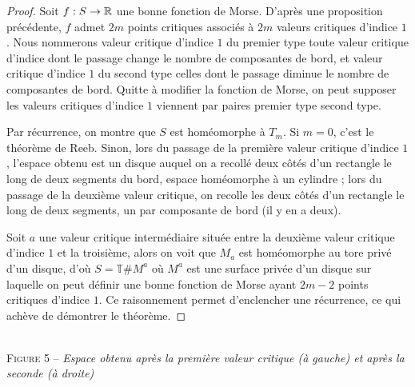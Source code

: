 \begin{proof}
    Soit $f:S\to\operatorname{\mathbb R}$ une bonne fonction de Morse. D'après une proposition précédente, $f$ admet 
    $2m$ points critiques associés à $2m$ valeurs critiques d'indice $1$. 
    Nous nommerons valeur critique d'indice $1$ du premier type toute valeur critique d'indice 
    dont le passage change le nombre de composantes de bord, et valeur critique d'indice $1$ 
    du second type celles dont le passage diminue le nombre de composantes de bord. 
    Quitte à modifier la fonction de Morse, on peut supposer les valeurs critiques d'indice 
    $1$ viennent par paires premier type second type. 

    Par récurrence, on montre que $S$ est homéomorphe à $T_m$. 
    Si $m=0$, c'est le théorème de Reeb.
    Sinon, lors du passage de la première valeur critique d'indice $1$, l'espace obtenu est un 
    disque auquel on a recollé deux côtés d'un rectangle le long de deux segments du bord, 
    espace homéomorphe à un cylindre ; lors du passage de la deuxième valeur critique, on 
    recolle les deux côtés d'un rectangle le long de deux segments, un par composante de 
    bord (il y en a deux).

    Soit $a$ une valeur critique intermédiaire située entre la deuxième valeur critique 
    d'indice $1$ et la troisième, alors on voit que $M_a$ est homéomorphe au tore privé 
    d'un disque, d'où $S=\mathbb T\#M^a$ où $M^a$ est une surface privée d'un disque 
    sur laquelle on peut définir une bonne fonction de Morse ayant $2m-2$ points critiques 
    d'indice $1$. Ce raisonnement permet d'enclencher une récurrence, ce qui achève de démontrer 
    le théorème.
\end{proof}

\begin{center}
    \\
    \textsc{Figure 5} – \textit{Espace obtenu après la première valeur critique (à gauche) et après la seconde (à droite)}
\end{center}
